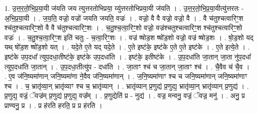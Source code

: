 \documentclass[17pt]{extarticle}
\begin{document}
1. उ॒त्त॒र॒तो॒भि॒प्र॒या॒यी ज॑यति जय त्युत्तरतोभिप्रया॒ य्यु॑त्तरतोभिप्रया॒यी ज॑यति । . उ॒त्त॒र॒तो॒भि॒प्र॒या॒यीत्यु॑त्तरतः - अ॒भि॒प्र॒या॒यी । . ज॒य॒ति॒ वज्रो॒ वज्रो॑ जयति जयति॒ वज्रः॑ । . वज्रो॒ वै वै वज्रो॒ वज्रो॒ वै । . वै च॑तुश्चत्वारिꣳ॒॒श श्च॑तुश्चत्वारिꣳ॒॒शो वै वै च॑तुश्चत्वारिꣳ॒॒शः । . च॒तु॒श्च॒त्वा॒रिꣳ॒॒शो वज्रो॒ वज्र॑श्चतुश्चत्वारिꣳ॒॒श श्च॑तुश्चत्वारिꣳ॒॒शो वज्रः॑ । . च॒तु॒श्च॒त्वा॒रिꣳ॒॒श इति॑ चतुः - च॒त्वा॒रिꣳ॒॒शः । . वज्र॑ ष्षोड॒श ष्षो॑ड॒शो वज्रो॒ वज्र॑ ष्षोड॒शः । . षो॒ड॒शो यद् यथ् षो॑ड॒श ष्षो॑ड॒शो यत् । . यदे॒ते ए॒ते यद् यदे॒ते । . ए॒ते इष्ट॑के॒ इष्ट॑के ए॒ते ए॒ते इष्ट॑के । . ए॒ते इत्ये॒ते । . इष्ट॑के उप॒दधा᳚ त्युप॒दधा॒तीष्ट॑के॒ इष्ट॑के उप॒दधा॑ति । . इष्ट॑के॒ इतीष्ट॑के । . उ॒प॒दधा॑ति जा॒तान् जा॒ता नु॑प॒दधा᳚ त्युप॒दधा॑ति जा॒तान् । . उ॒प॒दधा॒तीत्यु॑प - दधा॑ति । . जा॒ताꣳ श्च॑ च जा॒तान् जा॒ताꣳ श्च॑ । . चै॒वैव च॑ चै॒व । . ए॒व ज॑नि॒ष्यमा॑णान् जनि॒ष्यमा॑णा ने॒वैव ज॑नि॒ष्यमा॑णान् । . ज॒नि॒ष्यमा॑णाꣳ श्च च जनि॒ष्यमा॑णान् जनि॒ष्यमा॑णाꣳ श्च । . च॒ भ्रातृ॑व्या॒न् भ्रातृ॑व्याꣳ श्च च॒ भ्रातृ॑व्यान् । . भ्रातृ॑व्यान् प्र॒णुद्य॑ प्र॒णुद्य॒ भ्रातृ॑व्या॒न् भ्रातृ॑व्यान् प्र॒णुद्य॑ । . प्र॒णुद्य॒ वज्रं॒ ॅवज्र॑म् प्र॒णुद्य॑ प्र॒णुद्य॒ वज्र᳚म् । . प्र॒णुद्येति॑ प्र - नुद्य॑ । . वज्र॒ मन्वनु॒ वज्रं॒ ॅवज्र॒ मनु॑ । . अनु॒ प्र प्राण्वनु॒ प्र । . प्र ह॑रति हरति॒ प्र प्र ह॑रति । \newline
\end{document}
